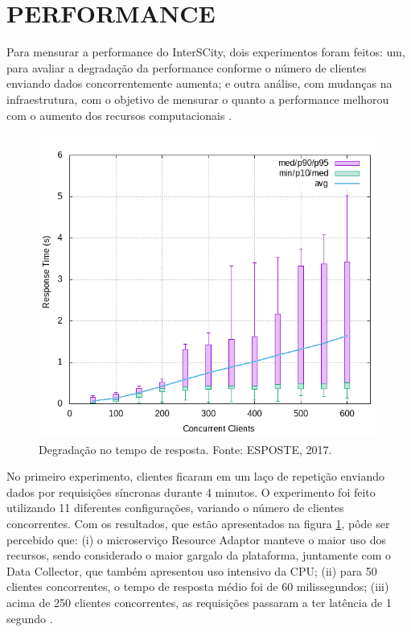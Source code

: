 \section{PERFORMANCE}

Para mensurar a performance do InterSCity, dois experimentos foram feitos:
um, para avaliar a degradação da performance conforme o número de clientes
enviando dados concorrentemente aumenta; e outra análise, com mudanças na %
infraestrutura, com o objetivo de mensurar o quanto a performance melhorou
com o aumento dos recursos computacionais \cite{delesposte2017}.

\begin{figure}
  \centering
    \includegraphics[scale=0.5]{figuras/benchmark1.png}
    \caption{Degradação no tempo de resposta. Fonte: ESPOSTE, 2017.}
  \label{fig:benchmark1}
\end{figure}

No primeiro experimento, clientes ficaram em um laço de repetição enviando
dados por requisições síncronas durante 4 minutos. O experimento foi feito
utilizando 11 diferentes configurações, variando o número de clientes
concorrentes. Com os resultados, que estão apresentados na figura
\ref{fig:benchmark1}, pôde ser percebido que: (i) o microserviço
Resource Adaptor manteve o maior uso dos recursos, sendo considerado o
maior gargalo da plataforma, juntamente com o Data Collector, que também
apresentou uso intensivo da CPU; (ii) para 50 clientes concorrentes, o
tempo de resposta médio foi de 60 milissegundos; (iii) acima de 250 clientes
concorrentes, as requisições passaram a ter latência de 1 segundo
\cite{delesposte2017}.

